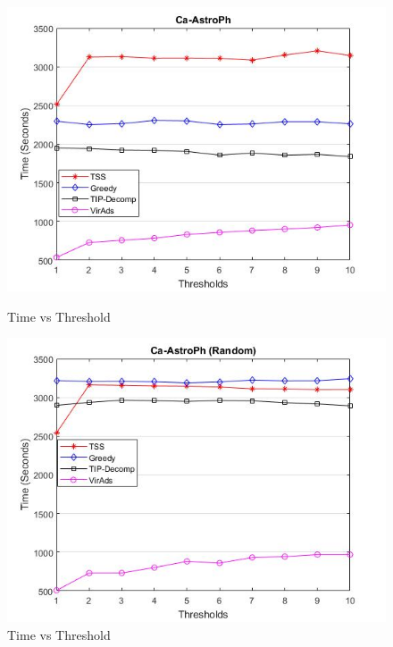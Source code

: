 \begin{figure}[h!]
\begin{minipage}[t]{0.50\textwidth}
\includegraphics[width=\linewidth,keepaspectratio=true]{images/ca-astrophtime.jpg}
\caption{Time vs Threshold}

\end{minipage}
\begin{minipage}[t]{0.50\textwidth}
\includegraphics[width=\linewidth,keepaspectratio=true]{images/ca-astrophtimerandom.jpg}
\caption{Time vs Threshold}
\end{minipage}
\end{figure}


